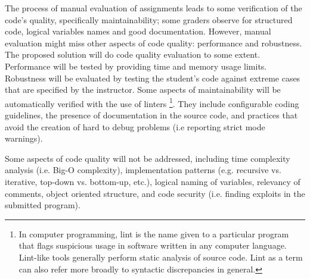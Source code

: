 The process of manual evaluation of assignments leads to some verification of
the code's quality, specifically maintainability; some graders observe for
structured code, logical variables names and good documentation. However, manual
evaluation might miss other aspects of code quality: performance and robustness.
The proposed solution will do code quality evaluation to some extent.
Performance will be tested by providing time and memory usage limits. Robustness
will be evaluated by testing the student's code against extreme cases that are
specified by the instructor. Some aspects of maintainability will be
automatically verified with the use of linters \footnote{In computer
programming, lint is the name given to a particular program that flags
suspicious usage in software written in any computer language. Lint-like tools
generally perform static analysis of source code. Lint as a term can also refer
more broadly to syntactic discrepancies in general.}. They include configurable
coding guidelines, the presence of documentation in the source code, and
practices that avoid the creation of hard to debug problems (i.e reporting
strict mode warnings).

Some aspects of code quality will not be addressed, including time complexity
analysis (i.e. Big-O complexity), implementation patterns (e.g. recursive vs.
iterative, top-down vs. bottom-up, etc.), logical naming of variables, relevancy of
comments, object oriented structure, and code security (i.e. finding exploits in
the submitted program).
